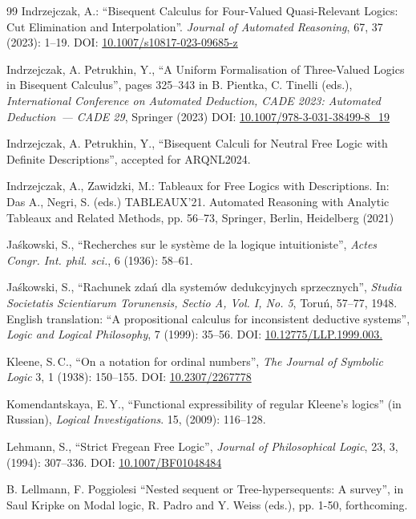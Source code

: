 \documentclass[11pt,a4paper,titlepage]{article}
\theoremstyle{definition}
\newcommand{\3}{\vspace{.3in}}
\newcommand{\2}{\vspace{.2in}}
\newcommand{\1}{\vspace{.1in}}
\newcommand{\5}{\vspace{.05in}}
\newcommand\DOI[2]{DOI: \href{#1#2}{#2}}
\newcommand{\ts}{\,}
\begin{document}
\begin{thebibliography}{99}
Indrzejczak, A.: ``Bisequent Calculus for Four-Valued Quasi-Relevant Logics: Cut Elimination and Interpolation''. \textit{Journal of Automated Reasoning}, 67, 37 (2023): 1--19.
\DOI{http://dx.doi.org/}{10.1007/s10817-023-09685-z}

Indrzejczak, A. Petrukhin, Y., ``A Uniform Formalisation of Three-Valued Logics in Bisequent Calculus'', pages 325--343 in B. Pientka, C. Tinelli (eds.), \textit{International Conference on Automated Deduction, CADE 2023: Automated Deduction~--- CADE 29}, Springer (2023) 
\DOI{http://dx.doi.org/}{10.1007/978-3-031-38499-8\_19}

Indrzejczak, A. Petrukhin, Y., ``Bisequent Calculi for Neutral Free Logic with Definite Descriptions'', accepted for ARQNL2024.


{
	Indrzejczak, A., Zawidzki, M.: Tableaux for Free
	Logics with Descriptions. In: Das A., Negri, S. (eds.) TABLEAUX'21.	Automated Reasoning with Analytic Tableaux and Related Methods, pp. 56--73, Springer, Berlin, Heidelberg (2021)}


Ja\'{s}kowski, S.,  
``Recherches sur le syst\`{e}me de la logique intuitioniste'', \textit{Actes Congr. Int. phil. sci.}, 6 (1936): 58--61.

Ja\'{s}kowski, S., ``Rachunek zda\'{n} dla system\'{o}w dedukcyjnych sprzecznych'', \textit{Studia Societatis Scientiarum Torunensis, Sectio A, Vol. I, No. 5}, Toru\'{n}, 57--77, 1948. English translation: ``A propositional calculus for inconsistent deductive systems'', \textit{Logic and Logical Philosophy}, 7 (1999): 35--56.
\DOI{http://dx.doi.org/}{10.12775/LLP.1999.003.}

 Kleene, S.\ts C., ``On a notation for ordinal numbers'', \textit{The Journal of Symbolic Logic} 3, 1 (1938): 150--155.
\DOI{http://dx.doi.org/}{10.2307/2267778}

Komendantskaya, E.\ts Y., ``Functional expressibility of regular Kleene's logics'' (in Russian), \textit{Logical Investigations}. 15, (2009): 116--128. 

Lehmann, S., ``Strict Fregean Free Logic'', \textit{Journal of Philosophical Logic}, 23, 3, (1994): 307--336.
\DOI{http://dx.doi.org/}{10.1007/BF01048484}

B. Lellmann, F. Poggiolesi ``Nested sequent or Tree-hypersequents: A survey'', in Saul Kripke on Modal logic, R. Padro and Y. Weiss (eds.), pp. 1-50, forthcoming.  



\end{thebibliography}
\end{document}
